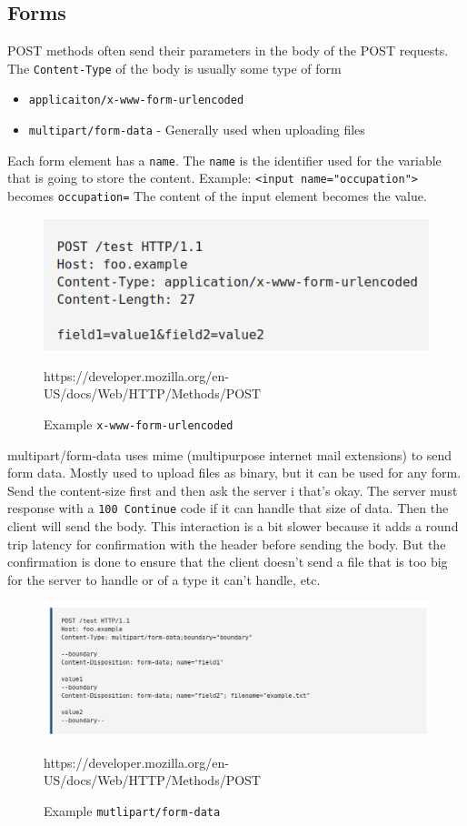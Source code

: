 \documentclass[../CMPUT-404-Notes.tex]{subfiles}
\begin{document}
\subsection{Forms}
POST methods often send their parameters in the body of the POST requests. The \texttt{Content-Type} of the body is usually some type of form
\begin{itemize}
  \item \texttt{applicaiton/x-www-form-urlencoded}
  \item \texttt{multipart/form-data} - Generally used when uploading files
\end{itemize}

Each form element has a \texttt{name}.
The \texttt{name} is the identifier used for the variable that is going to store the content.
Example: \texttt{<input name="occupation">} becomes \texttt{occupation=}
The content of the input element becomes the value.

\begin{figure}[htpb]
  \centering
  \includegraphics[width=0.8\columnwidth]{../assets/x-www-form-urlencoded.png}
  \caption{Example \texttt{x-www-form-urlencoded}}
  \label{fig:assets-x-www-form-urlencoded-png}
  https://developer.mozilla.org/en-US/docs/Web/HTTP/Methods/POST
\end{figure}


multipart/form-data uses mime (multipurpose internet mail extensions) to send form data.
Mostly used to upload files as binary, but it can be used for any form. 
Send the content-size first and then ask the server i that's okay.
The server must response with a \texttt{100 Continue} code if it can handle that size of data.
Then the client will send the body.
This interaction is a bit slower because it adds a round trip latency for confirmation with the header before sending the body.
But the confirmation is done to ensure that the client doesn't send a file that is too big for the server to handle or of a type it can't handle, etc.

\begin{figure}[htpb]
  \centering
  \includegraphics[width=0.8\columnwidth]{../assets/multipart-form-data.png}
  \caption{Example \texttt{mutlipart/form-data}}
  \label{fig:-assets-multipart-form-data-png}
  https://developer.mozilla.org/en-US/docs/Web/HTTP/Methods/POST
\end{figure}
\end{document}
